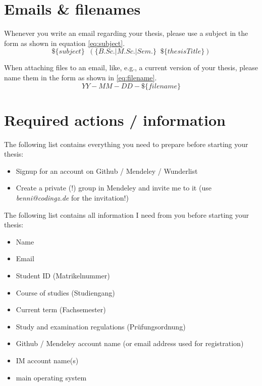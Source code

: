 \documentclass{article}
\begin{document}
\section{Emails \& filenames}

Whenever you write an email regarding your thesis, please use a subject in the form as shown in equation \ref{eq:subject}.
\begin{equation} \label{eq:subject}
	\$\{subject\} \;\; (\{B.Sc. | M.Sc. | Sem.\} \;\; \$\{thesisTitle\})
\end{equation}

When attaching files to an email, like, e.g., a current version of your thesis, please name them in the form as shown in \ref{eq:filename}.
\begin{equation} \label{eq:filename}
	YY\!\!-\!\!MM\!\!-\!\!DD\!-\!\$\{filename\}
\end{equation}










\section{Required actions / information}

The following list contains everything you need to prepare before starting your thesis:

\begin{itemize}
	\item Signup for an account on Github / Mendeley / Wunderlist
	\item Create a private (!) group in Mendeley and invite me to it (use \emph{benni@codingz.de} for the invitation!)
\end{itemize}

The following list contains all information I need from you before starting your thesis:

\begin{itemize}
	\item Name
	\item Email
	\item Student ID (Matrikelnummer)
	\item Course of studies (Studiengang)
	\item Current term (Fachsemester)
	\item Study and examination regulations (Pr\"{u}fungsordnung)
	\item Github / Mendeley account name (or email address used for registration)
	\item IM account name(s)
	\item main operating system
\end{itemize}
\end{document}
